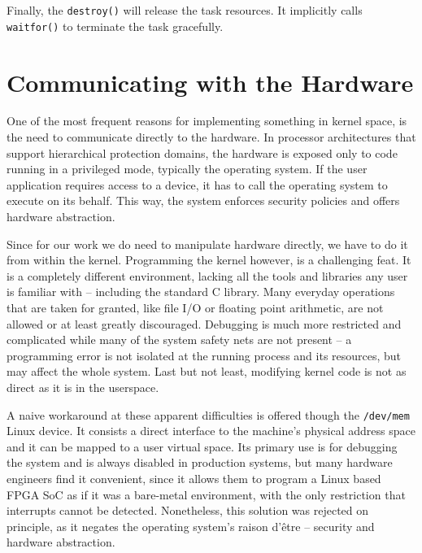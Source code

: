 Finally, the \texttt{destroy()} will release the task resources.
It implicitly calls \texttt{waitfor()} to terminate the task gracefully.


\section{Communicating with the Hardware}

One of the most frequent reasons for implementing something in kernel space,
is the need to communicate directly to the hardware. In processor architectures
that support hierarchical protection domains, the hardware is exposed only to
code running in a privileged mode, typically the operating system.
If the user application requires access to a device, it has to call the operating
system to execute on its behalf. This way, the system enforces security policies
and offers hardware abstraction. 

Since for our work we do need to manipulate hardware directly, we have to do it from
within the kernel. Programming the kernel however, is a challenging feat.
It is a completely different environment, lacking all the tools and libraries any
user is familiar with -- including the standard C library. Many everyday operations
that are taken for granted, like file I/O or floating point arithmetic,
are not allowed or at least greatly discouraged. Debugging is much more restricted
and complicated while many of the system safety nets are not present -- a programming
error is not isolated at the running process and its resources, but may affect the whole system.
Last but not least, modifying kernel code is not as direct as it is in the userspace.

A naive workaround at these apparent difficulties is offered though the \texttt{/dev/mem} Linux device. 
It consists a direct interface to the machine's physical address space and it can be mapped to a user virtual space. 
Its primary use is for debugging the system and is always disabled in production systems, but many hardware engineers
find it convenient, since it allows them to program a Linux based FPGA SoC as if it was a bare-metal environment,
with the only restriction that interrupts cannot be detected. 
Nonetheless, this solution was rejected on principle, as it negates the operating system's raison d'être --
security and hardware abstraction.

